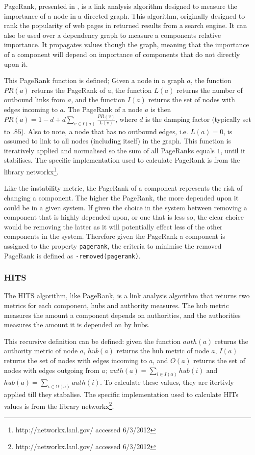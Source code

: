 PageRank, presented in \citep{page1998}, is a link analysis algorithm designed to measure the importance of a node in a directed graph.
This algorithm, originally designed to rank the popularity of web pages in returned results from a search engine.
It can also be used over a dependency graph to measure a components relative importance.
It propagates values though the graph, meaning that the importance of a component will depend on importance of components that do not directly upon it. 

This PageRank function is defined;
Given a node in a graph $a$, the function $PR(a)$ returns the PageRank of $a$, 
the function $L(a)$ returns the number of outbound links from $a$, 
and the function $I(a)$ returns the set of nodes with edges incoming to $a$.
The PageRank of a node $a$ is then $PR(a) = 1-d + d\sum\limits_{v \in I(a)} \frac{PR(v)}{L(v)}$,
where $d$ is the damping factor (typically set to $.85$).
Also to note, a node that has no outbound edges, i.e. $L(a) = 0$, is assumed to link to all nodes (including itself) in the graph.
This function is iteratively applied and normalised so the sum of all PageRanks equals $1$, until it stabilises.
The specific implementation used to calculate PageRank is from the library networkx\footnote{http://networkx.lanl.gov/ accessed 6/3/2012}.

Like the instability metric, the PageRank of a component represents the risk of changing a component.
The higher the PageRank, the more depended upon it could be in a given system.
If given the choice in the system between removing a component that is highly depended upon, or one that is less so,
the clear choice would be removing the latter as it will potentially effect less of the other components in the system.
Therefore given the PageRank a component is assigned to the property \verb+pagerank+, the criteria to minimise the removed PageRank is defined as \verb!-removed(pagerank)!.


\subsubsection{HITS}
The HITS algorithm, like PageRank, is a link analysis algorithm that returns two metrics for each component, hubs and authority measures.
The hub metric measures the amount a component depends on authorities, and the authorities measures the amount it is depended on by hubs.

This recursive definition can be defined:
given the function $auth(a)$ returns the authority metric of node $a$, $hub(a)$ returns the hub metric of node $a$,
$I(a)$ returns the set of nodes with edges incoming to $a$, and $O(a)$ returns the set of nodes with edges outgoing from $a$;
$auth(a) = \sum \limits_{i \in I(a)} hub(i)$ and  $hub(a) = \sum \limits_{i \in O(a)} auth(i)$.
To calculate these values, they are itertivly applied till they stabalise.
The specific implementation used to calculate HITs values is from the library networkx\footnote{http://networkx.lanl.gov/ accessed 6/3/2012}.

